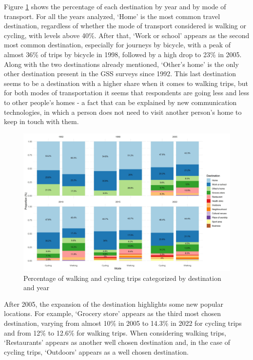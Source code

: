 \documentclass[preprint, 3p,
authoryear]{elsarticle} %
\begin{document}
Figure \ref{fig:figure-destmodeyearperc} shows the percentage of each
destination by year and by mode of transport. For all the years
analyzed, `Home' is the most common travel destination, regardless of
whether the mode of transport considered is walking or cycling, with
levels above 40\%. After that, `Work or school' appears as the second
most common destination, especially for journeys by bicycle, with a peak
of almost 36\% of trips by bicycle in 1998, followed by a high drop to
23\% in 2005. Along with the two destinations already mentioned,
`Other's home' is the only other destination present in the GSS surveys
since 1992. This last destination seems to be a destination with a
higher share when it comes to walking trips, but for both modes of
transportation it seems that respondents are going less and less to
other people's homes - a fact that can be explained by new communication
technologies, in which a person does not need to visit another person's
home to keep in touch with them.

\begin{figure}
\includegraphics[width=1\linewidth]{figures/destination_percentual} \caption{Percentage of walking and cycling trips categorized by destination and year}\label{fig:figure-destmodeyearperc}
\end{figure}

After 2005, the expansion of the destination highlights some new popular
locations. For example, `Grocery store' appears as the third most chosen
destination, varying from almost 10\% in 2005 to 14.3\% in 2022 for
cycling trips and from 12\% to 12.6\% for walking trips. When
considering walking trips, `Restaurants' appears as another well chosen
destination and, in the case of cycling trips, `Outdoors' appears as a
well chosen destination.
\end{document}
